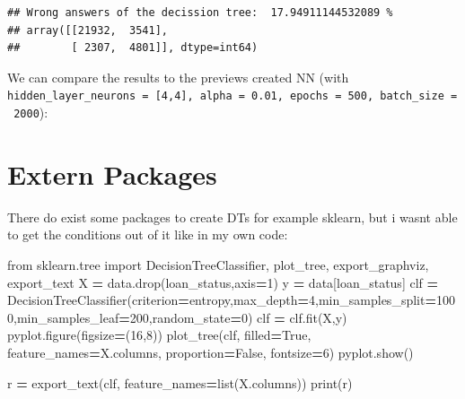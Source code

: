 \documentclass[
]{book}
\newenvironment{Shaded}{\begin{snugshade}}{\end{snugshade}}
\newcommand{\BuiltInTok}[1]{#1}
\newcommand{\DecValTok}[1]{\textcolor[rgb]{0.00,0.00,0.81}{#1}}
\newcommand{\ImportTok}[1]{#1}
\newcommand{\NormalTok}[1]{#1}
\newcommand{\OperatorTok}[1]{\textcolor[rgb]{0.81,0.36,0.00}{\textbf{#1}}}
\newcommand{\StringTok}[1]{\textcolor[rgb]{0.31,0.60,0.02}{#1}}
\newcommand{\VariableTok}[1]{\textcolor[rgb]{0.00,0.00,0.00}{#1}}
\begin{document}
\begin{verbatim}
## Wrong answers of the decission tree:  17.94911144532089 %
## array([[21932,  3541],
##        [ 2307,  4801]], dtype=int64)
\end{verbatim}

We can compare the results to the previews created NN (with \texttt{hidden\_layer\_neurons\ =\ {[}4,4{]},\ alpha\ =\ 0.01,\ epochs\ =\ 500,\ batch\_size\ =\ 2000}):

\hypertarget{extern-packages}{%
\section{Extern Packages}\label{extern-packages}}

There do exist some packages to create DTs for example sklearn, but i wasnt able to get the conditions out of it like in my own code:

\begin{Shaded}
\begin{Highlighting}[]
\ImportTok{from}\NormalTok{ sklearn.tree }\ImportTok{import}\NormalTok{ DecisionTreeClassifier, plot\_tree, export\_graphviz, export\_text}
\NormalTok{X }\OperatorTok{=}\NormalTok{ data.drop(}\StringTok{\textquotesingle{}loan\_status\textquotesingle{}}\NormalTok{,axis}\OperatorTok{=}\DecValTok{1}\NormalTok{)}
\NormalTok{y }\OperatorTok{=}\NormalTok{ data[}\StringTok{\textquotesingle{}loan\_status\textquotesingle{}}\NormalTok{]}
\NormalTok{clf }\OperatorTok{=}\NormalTok{ DecisionTreeClassifier(criterion}\OperatorTok{=}\StringTok{\textquotesingle{}entropy\textquotesingle{}}\NormalTok{,max\_depth}\OperatorTok{=}\DecValTok{4}\NormalTok{,min\_samples\_split}\OperatorTok{=}\DecValTok{1000}\NormalTok{,min\_samples\_leaf}\OperatorTok{=}\DecValTok{200}\NormalTok{,random\_state}\OperatorTok{=}\DecValTok{0}\NormalTok{)}
\NormalTok{clf }\OperatorTok{=}\NormalTok{ clf.fit(X,y)}
\NormalTok{pyplot.figure(figsize}\OperatorTok{=}\NormalTok{(}\DecValTok{16}\NormalTok{,}\DecValTok{8}\NormalTok{))}
\NormalTok{plot\_tree(clf, filled}\OperatorTok{=}\VariableTok{True}\NormalTok{, feature\_names}\OperatorTok{=}\NormalTok{X.columns, proportion}\OperatorTok{=}\VariableTok{False}\NormalTok{, fontsize}\OperatorTok{=}\DecValTok{6}\NormalTok{)}
\NormalTok{pyplot.show()}

\NormalTok{r }\OperatorTok{=}\NormalTok{ export\_text(clf, feature\_names}\OperatorTok{=}\BuiltInTok{list}\NormalTok{(X.columns))}
\BuiltInTok{print}\NormalTok{(r)}
\end{Highlighting}
\end{Shaded}
\end{document}
